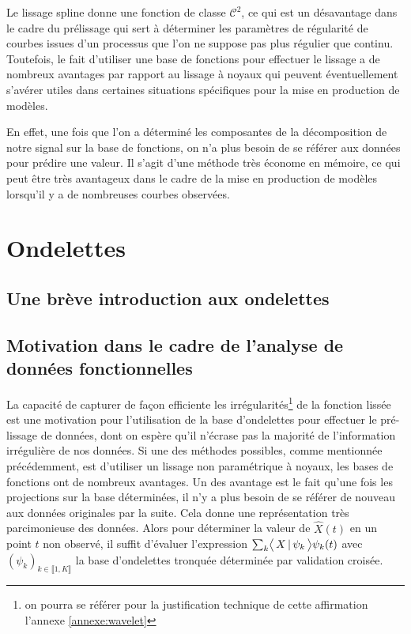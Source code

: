 
Le lissage spline donne une fonction de classe $\mathcal C^2$, ce qui est un désavantage dans le cadre du prélissage qui sert à déterminer les paramètres de régularité de courbes issues d'un processus que l'on ne suppose pas plus régulier que continu. Toutefois, le fait d'utiliser une base de fonctions pour effectuer le lissage a de nombreux avantages par rapport au lissage à noyaux qui peuvent éventuellement s'avérer utiles dans certaines situations spécifiques pour la mise en production de modèles.

En effet, une fois que l'on a déterminé les composantes de la décomposition de notre signal sur la base de fonctions, on n'a plus besoin de se référer aux données pour prédire une valeur. Il s'agit d'une méthode très économe en mémoire, ce qui peut être très avantageux dans le cadre de la mise en production de modèles lorsqu'il y a de nombreuses courbes observées.

\section{Ondelettes}
\subsection{Une brève introduction aux ondelettes}




\subsection{Motivation dans le cadre de l'analyse de données fonctionnelles}

La capacité de capturer de façon efficiente les irrégularités\footnote{on pourra se référer pour la justification technique de cette affirmation l'annexe \ref{annexe:wavelet}} de la fonction lissée est une motivation pour l'utilisation de la base d'ondelettes pour effectuer le pré-lissage de données, dont on espère qu'il n'écrase pas la majorité de l'information irrégulière de nos données. Si une des méthodes possibles, comme mentionnée précédemment, est d'utiliser un lissage non paramétrique à noyaux, les bases de fonctions ont de nombreux avantages. Un des avantage est le fait qu'une fois les projections sur la base déterminées, il n'y a plus besoin de se référer de nouveau aux données originales par la suite. Cela donne une représentation très parcimonieuse des données. Alors pour déterminer la valeur de $\widehat X(t)$ en un point $t$ non observé, il suffit d'évaluer l'expression $\sum_k \prodscal X {\psi_k} \psi_k(t)$ avec $(\psi_k)_{k \in \llbracket 1, K \rrbracket}$ la base d'ondelettes tronquée déterminée par validation croisée.
